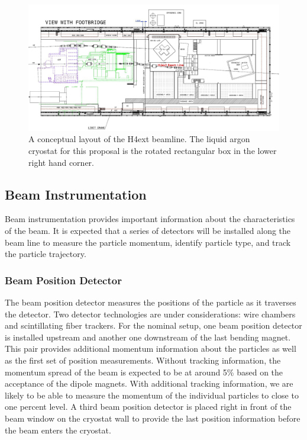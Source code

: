 \begin{figure}[h]
  \centering
\includegraphics[scale=0.3]{figures/EHN1Ext_Prelim2.jpg}
  \caption{A conceptual layout of the H4ext beamline. The liquid argon cryostat for this proposal is the rotated rectangular box in the lower right hand corner.  }
  \label{fig:H4extPrelim}
\end{figure}


\subsection{Beam Instrumentation}
\label{beaminstrument}
Beam instrumentation provides important information about the characteristics of the beam. It is expected that a series of detectors will be installed along the beam line to measure the particle momentum, identify particle type, and track the particle trajectory.

\subsubsection{Beam Position Detector}
The beam position detector measures the positions of the particle as it traverses the detector. Two detector technologies are under considerations: wire chambers and scintillating fiber trackers. For the nominal setup, one beam position detector is installed upstream and another one downstream of the last bending magnet. This pair provides additional momentum information about the particles as well as the first set of position measurements. Without tracking information, the momentum spread of the beam is expected to be at around 5\% based on the acceptance of the dipole magnets. With additional tracking information, we are likely to be able to measure the momentum of the individual particles to close to one percent level. A third beam position detector is placed right in front of the beam window on the cryostat wall to provide the last position information before the beam enters the cryostat.

